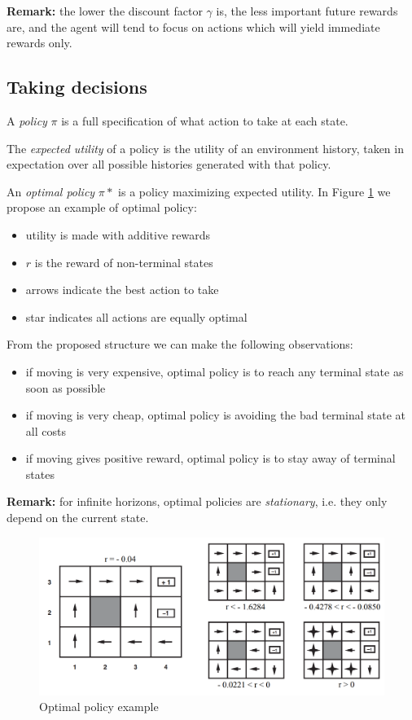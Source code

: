 \textbf{Remark:} the lower the discount factor $\gamma$ is, the less important future rewards are, and the agent will tend to focus on actions which will yield immediate rewards only.

\subsection{Taking decisions}
A \textit{policy} $\pi$ is a full specification of what action to take at each state. \newline

The \textit{expected utility} of a policy is the utility of an environment history, taken in expectation over all possible histories generated with that policy. \newline

An \textit{optimal policy} $\pi*$ is a policy maximizing expected utility. In Figure \ref{fig:optimalPolicy} we propose an example of optimal policy:
\begin{itemize}
    \item utility is made with additive rewards
    \item $r$ is the reward of non-terminal states
    \item arrows indicate the best action to take
    \item star indicates all actions are equally optimal
\end{itemize}
From the proposed structure we can make the following observations:
\begin{itemize}
    \item if moving is very expensive, optimal policy is to reach any terminal state as soon as possible
    
    \item if moving is very cheap, optimal policy is avoiding the bad terminal state at all costs
    
    \item if moving gives positive reward, optimal policy is to stay away of terminal states
\end{itemize}

\textbf{Remark:} for infinite horizons, optimal policies are \textit{stationary}, i.e. they only depend on the current state.

\begin{figure}
    \centering
    \includegraphics[width=\textwidth]{images/optimalPolicy.png}
    \caption{Optimal policy example}
    \label{fig:optimalPolicy}
\end{figure}

